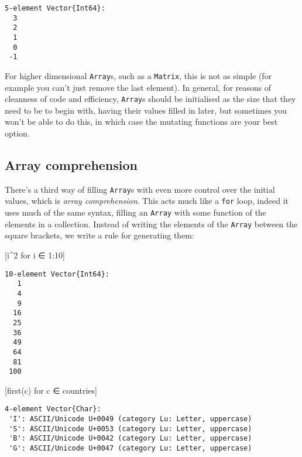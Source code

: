 \documentclass[
  letterpaper,
  DIV=11,
  numbers=noendperiod]{scrreprt}
\newenvironment{Shaded}{\begin{snugshade}}{\end{snugshade}}
\newcommand{\FloatTok}[1]{\textcolor[rgb]{0.68,0.00,0.00}{#1}}
\newcommand{\FunctionTok}[1]{\textcolor[rgb]{0.28,0.35,0.67}{#1}}
\newcommand{\NormalTok}[1]{\textcolor[rgb]{0.00,0.23,0.31}{#1}}
\newcommand{\OperatorTok}[1]{\textcolor[rgb]{0.37,0.37,0.37}{#1}}
\begin{document}
\begin{verbatim}
5-element Vector{Int64}:
  3
  2
  1
  0
 -1
\end{verbatim}

For higher dimensional \texttt{Array}s, such as a \texttt{Matrix}, this
is not as simple (for example you can't just remove the last element).
In general, for reasons of cleanness of code and efficiency,
\texttt{Array}s should be initialised as the size that they need to be
to begin with, having their values filled in later, but sometimes you
won't be able to do this, in which case the mutating functions are your
best option.

\hypertarget{array-comprehension}{%
\subsection{Array comprehension}\label{array-comprehension}}

There's a third way of filling \texttt{Array}s with even more control
over the initial values, which is \emph{array comprehension}. This acts
much like a \texttt{for} loop, indeed it uses much of the same syntax,
filling an \texttt{Array} with some function of the elements in a
collection. Instead of writing the elements of the \texttt{Array}
between the square brackets, we write a rule for generating them:

\begin{Shaded}
\begin{Highlighting}[]
\NormalTok{[i}\OperatorTok{\^{}}\FloatTok{2}\NormalTok{ for i }\OperatorTok{∈} \FloatTok{1}\OperatorTok{:}\FloatTok{10}\NormalTok{]}
\end{Highlighting}
\end{Shaded}

\begin{verbatim}
10-element Vector{Int64}:
   1
   4
   9
  16
  25
  36
  49
  64
  81
 100
\end{verbatim}

\begin{Shaded}
\begin{Highlighting}[]
\NormalTok{[}\FunctionTok{first}\NormalTok{(c) for c }\OperatorTok{∈}\NormalTok{ countries]}
\end{Highlighting}
\end{Shaded}

\begin{verbatim}
4-element Vector{Char}:
 'I': ASCII/Unicode U+0049 (category Lu: Letter, uppercase)
 'S': ASCII/Unicode U+0053 (category Lu: Letter, uppercase)
 'B': ASCII/Unicode U+0042 (category Lu: Letter, uppercase)
 'G': ASCII/Unicode U+0047 (category Lu: Letter, uppercase)
\end{verbatim}
\end{document}
